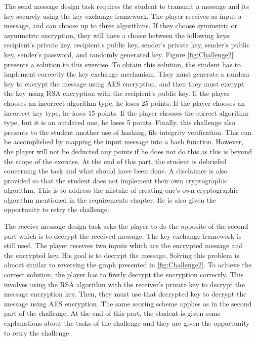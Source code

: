 \documentclass{l4proj}
\begin{document}
The send message design task requires the student to transmit a message and its key securely using
the key exchange framework. 
The player receives as input a message, and can choose up to three algorithms. 
If they choose symmetric or asymmetric encryption, they will have a choice between the following keys:
recipient's private key, recipient's public key, sender's private key, sender's public key, 
sender's password, and randomly generated key. 
Figure \ref{fig:Challenge2} presents a solution to this exercise. To obtain this solution,
the student has to implement correctly the key exchange mechanism. 
They must generate a random key to encrypt the message using AES encryption, 
and then they must encrypt the key using RSA encryption with the recipient's public key.
If the player chooses an incorrect algorithm type, he loses 25 points. 
If the player chooses an incorrect key type, he loses 15 points.
If the player chooses the correct algorithm type, but it is an outdated one, he loses 5 points. 
Finally, this challenge also presents to the student another use of hashing, file integrity verification.
This can be accomplished by mapping the input message into a hash function.
However, the player will not be deducted any points if he does not do this 
as this is beyond the scope of the exercise.
At the end of this part, the student is debriefed concerning the task and what should have been done.
A disclaimer is also provided so that the student does not implement their own cryptographic algorithm.
This is to address the mistake of creating one's own cryptographic algorithm mentioned in the requirements chapter.
He is also given the opportunity to retry the challenge.

The receive message design task asks the player to do the opposite of the second part which
is to decrypt the received message. The key exchange framework is still used.
The player receives two inputs which are the encrypted message and the encrypted key.
His goal is to decrypt the message.
Solving this problem is almost similar to reversing the graph presented in \ref{fig:Challenge2}.
To achieve the correct solution, the player has to firstly decrypt the encryption correctly.
This involves using the RSA algorithm with the receiver's private key to decrypt the message encryption key.
Then, they must use that decrypted key to decrypt the message using AES encryption.
The same scoring scheme applies as in the second part of the challenge. 
At the end of this part, the student is given some explanations about the tasks of the challenge and
they are given the opportunity to retry the challenge.
\end{document}
